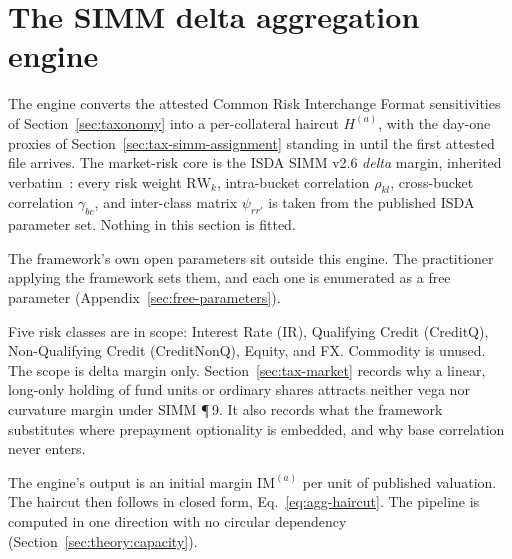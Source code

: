 \section{The SIMM delta aggregation engine}\label{sec:normalisation}
The engine converts the attested Common Risk Interchange Format sensitivities of Section~\ref{sec:taxonomy} into a
per-collateral haircut $H^{(a)}$, with the day-one proxies of
Section~\ref{sec:tax-simm-assignment} standing in until the first attested file arrives. The
market-risk core is the ISDA SIMM v2.6 \emph{delta} margin, inherited
verbatim~\cite{isda_simm_v2_6}: every risk weight $\mathrm{RW}_k$, intra-bucket correlation
$\rho_{kl}$, cross-bucket correlation $\gamma_{bc}$, and inter-class matrix $\psi_{rr'}$ is
taken from the published ISDA parameter set. Nothing in this section is fitted.

The framework's own open parameters sit outside this engine. The practitioner applying the
framework sets them, and each one is enumerated as a free parameter
(Appendix~\ref{sec:free-parameters}).

Five risk classes are in scope: Interest Rate (IR), Qualifying Credit (CreditQ),
Non-Qualifying Credit (CreditNonQ), Equity, and FX. Commodity is unused. The scope is delta
margin only. Section~\ref{sec:tax-market} records why a linear, long-only holding of fund
units or ordinary shares attracts neither vega nor curvature margin under SIMM \P\,9. It also records what the
framework substitutes where prepayment optionality is embedded, and why base correlation
never enters.

The engine's output is an initial margin $\mathrm{IM}^{(a)}$ per unit of published
valuation. The haircut then follows in closed form, Eq.~\eqref{eq:agg-haircut}. The
pipeline is computed in one direction with no circular dependency
(Section~\ref{sec:theory:capacity}).

